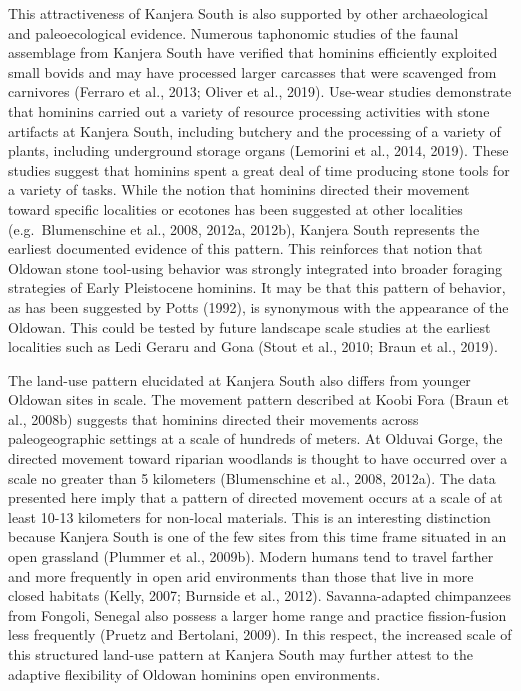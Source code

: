 \documentclass[]{elsarticle} %
\begin{document}
This attractiveness of Kanjera South is also supported by other
archaeological and paleoecological evidence. Numerous taphonomic studies
of the faunal assemblage from Kanjera South have verified that hominins
efficiently exploited small bovids and may have processed larger
carcasses that were scavenged from carnivores (Ferraro et al., 2013;
Oliver et al., 2019). Use-wear studies demonstrate that hominins carried
out a variety of resource processing activities with stone artifacts at
Kanjera South, including butchery and the processing of a variety of
plants, including underground storage organs (Lemorini et al., 2014,
2019). These studies suggest that hominins spent a great deal of time
producing stone tools for a variety of tasks. While the notion that
hominins directed their movement toward specific localities or ecotones
has been suggested at other localities (e.g.~Blumenschine et al., 2008,
2012a, 2012b), Kanjera South represents the earliest documented evidence
of this pattern. This reinforces that notion that Oldowan stone
tool-using behavior was strongly integrated into broader foraging
strategies of Early Pleistocene hominins. It may be that this pattern of
behavior, as has been suggested by Potts (1992), is synonymous with the
appearance of the Oldowan. This could be tested by future landscape
scale studies at the earliest localities such as Ledi Geraru and Gona
(Stout et al., 2010; Braun et al., 2019).

The land-use pattern elucidated at Kanjera South also differs from
younger Oldowan sites in scale. The movement pattern described at Koobi
Fora (Braun et al., 2008b) suggests that hominins directed their
movements across paleogeographic settings at a scale of hundreds of
meters. At Olduvai Gorge, the directed movement toward riparian
woodlands is thought to have occurred over a scale no greater than 5
kilometers (Blumenschine et al., 2008, 2012a). The data presented here
imply that a pattern of directed movement occurs at a scale of at least
10-13 kilometers for non-local materials. This is an interesting
distinction because Kanjera South is one of the few sites from this time
frame situated in an open grassland (Plummer et al., 2009b). Modern
humans tend to travel farther and more frequently in open arid
environments than those that live in more closed habitats (Kelly, 2007;
Burnside et al., 2012). Savanna-adapted chimpanzees from Fongoli,
Senegal also possess a larger home range and practice fission-fusion
less frequently (Pruetz and Bertolani, 2009). In this respect, the
increased scale of this structured land-use pattern at Kanjera South may
further attest to the adaptive flexibility of Oldowan hominins open
environments.
\end{document}
